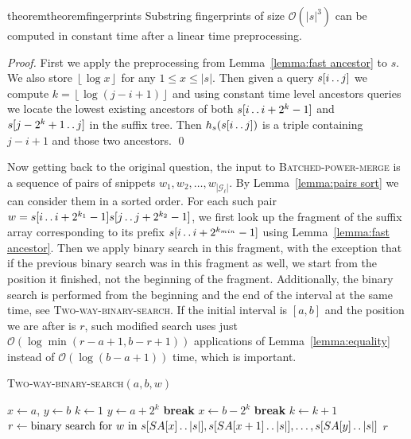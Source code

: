 \documentclass[runningheads]{llncs}
\newcommand{\twodots}{\mathinner{\ldotp\ldotp}}
\newcommand{\proc}[1]{\textnormal{\scshape#1}}
\begin{document}
\begin{restatable}{theorem}{theoremfingerprints}
\label{theorem:fingerprints}
Substring fingerprints of size $\mathcal{O}(|s|^3)$ can be computed in constant time after a linear time preprocessing.
\end{restatable}

\begin{proof}
First we apply the preprocessing from Lemma~\ref{lemma:fast ancestor} to $s$. We also store $\left\lfloor\log x\right\rfloor$ for any $1\leq x\leq |s|$. Then given a query $s[i\twodots j]$ we compute $k=\left\lfloor\log(j-i+1) \right\rfloor$ and using constant time level ancestors queries we locate the lowest existing ancestors of both $s[i\twodots i+2^k-1]$ and $s[j-2^k+1\twodots j]$ in the suffix tree. Then $h_s(s[i\twodots j])$ is a triple containing $j-i+1$ and those two ancestors.
\qed
\end{proof}

Now getting back to the original question, the input to \proc{Batched-power-merge} is a sequence of pairs of snippets $w_{1},w_{2},\ldots,w_{\left|\mathcal{G}_\ell\right|}$. By Lemma~\ref{lemma:pairs sort} we can consider them in a sorted order. For each such pair $w=s[i\twodots i+2^{k_1}-1] s[j\twodots j+2^{k_2}-1]$, we first look up the fragment of the suffix array corresponding to its prefix $s[i\twodots i+2^{k_{min}}-1]$ using Lemma~\ref{lemma:fast ancestor}. Then we apply binary search in this fragment, with the exception that if the previous binary search was in this fragment as well, we start from the position it finished, not the beginning of the fragment. Additionally, the binary search is performed from the beginning and the end of the interval at the same time, see \proc{Two-way-binary-search}. If the initial interval is $[a,b]$ and the position we are after is $r$, such modified search uses just $\mathcal{O}(\log\min(r-a+1,b-r+1))$ applications of Lemma~\ref{lemma:equality} instead of $\mathcal{O}(\log(b-a+1))$ time, which is important.

\begin{algorithm}
\caption{\proc{Two-way-binary-search}$(a,b,w)$}
\begin{algorithmic}[1]
\State $x \gets a$, $y \gets b$
\State $k \gets 1$
    \State $y \gets a + 2^k$
    \State \textbf{break}
  \EndIf
    \State $x \gets b - 2^k$
    \State \textbf{break}
  \EndIf
  \State $k \gets k + 1$
\EndWhile
\State $r \gets \text{binary search for } w \text{ in } s[SA[x]\twodots |s|],s[SA[x+1]\twodots |s|],\ldots,s[SA[y]\twodots |s|]$
\State \Return $r$
\end{algorithmic}
\end{algorithm}
\end{document}
